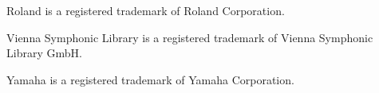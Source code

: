 \documentclass{article}
\begin{document}
\begin{multicols*}{4}
  Roland is a registered trademark of Roland Corporation.

  Vienna Symphonic Library is a registered trademark of Vienna Symphonic Library GmbH.

  Yamaha is a registered trademark of Yamaha Corporation.
\end{multicols*}
\end{document}

